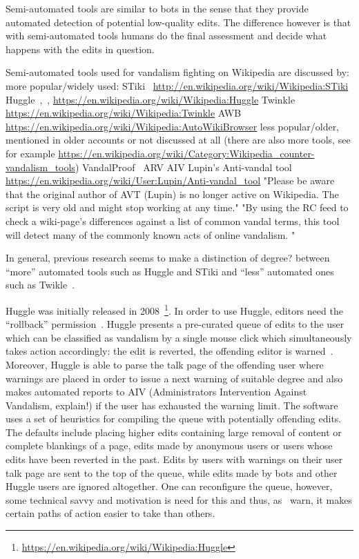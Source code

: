 Semi-automated tools are similar to bots in the sense that they provide automated detection of potential low-quality edits.
The difference however is that with semi-automated tools humans do the final assessment and decide what happens with the edits in question.

Semi-automated tools used for vandalism fighting on Wikipedia are discussed by:
more popular/widely used:
STiki~\cite{WestKanLee2010}
\url{http://en.wikipedia.org/wiki/Wikipedia:STiki}
Huggle~\cite{GeiHal2013},~\cite{HalRied2012},\cite{GeiRib2010}
\url{https://en.wikipedia.org/wiki/Wikipedia:Huggle}
Twinkle
\url{https://en.wikipedia.org/wiki/Wikipedia:Twinkle}
AWB
\url{https://en.wikipedia.org/wiki/Wikipedia:AutoWikiBrowser}
less popular/older, mentioned in older accounts or not discussed at all (there are also more tools, see for example \url{https://en.wikipedia.org/wiki/Category:Wikipedia_counter-vandalism_tools})
VandalProof~\cite{HalRied2012}
ARV
AIV
Lupin's Anti-vandal tool~\cite{GeiRib2010}
\url{https://en.wikipedia.org/wiki/User:Lupin/Anti-vandal_tool}
"Please be aware that the original author of AVT (Lupin) is no longer active on Wikipedia. The script is very old and might stop working at any time."
"By using the RC feed to check a wiki-page's differences against a list of common vandal terms, this tool will detect many of the commonly known acts of online vandalism. "

In general, previous research seems to make a distinction of degree? between ``more'' automated tools such as Huggle and STiki and ``less'' automated ones such as Twikle~\cite{GeiHal2013}.

Huggle was initially released in 2008~\footnote{\url{https://en.wikipedia.org/wiki/Wikipedia:Huggle}}.
In order to use Huggle, editors need the ``rollback'' permission~\cite{HalRied2012}.
Huggle presents a pre-curated queue of edits to the user which can be classified as vandalism by a single mouse click which simultaneously takes action accordingly: the edit is reverted, the offending editor is warned~\cite{HalRied2012}.
Moreover, Huggle is able to parse the talk page of the offending user where warnings are placed in order to issue a next warning of suitable degree and also makes automated reports to AIV (Administrators Intervention Against Vandalism, explain!) if the user has exhausted the warning limit.
The software uses a set of heuristics for compiling the queue with potentially offending edits.
The defaults include placing higher edits containing large removal of content or complete blankings of a page, edits made by anonymous users or users whose edits have been reverted in the past.
Edits by users with warnings on their user talk page are sent to the top of the queue, while edits made by bots and other Huggle users are ignored altogether\cite{GeiRib2010}.
One can reconfigure the queue, however, some technical savvy and motivation is need for this and thus, as~\cite{GeiRib2010} warn, it makes certain paths of action easier to take than others.

